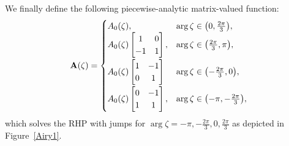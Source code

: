 \documentclass[pdftex]{sigma}
\numberwithin{equation}{section}
\theoremstyle{definition}
\begin{document}
We finally define the following piecewise-analytic matrix-valued function:{\samepage
\begin{gather}
		{\bf A} (\zeta) =
 \begin{cases}
 A_0(\zeta), & \operatorname{arg} \zeta\in\bigl(0,\frac{2\pi}{3}\bigr), \\
 A_0(\zeta)\begin{bmatrix}
 1 & 0 \\
 -1 & 1 \\
 \end{bmatrix}, & \operatorname{arg}\zeta\in\bigl(\frac{2\pi}{3},\pi\bigr), \\[10pt]
 A_0(\zeta)\begin{bmatrix}
 1 & -1\\
 0 & 1\\
 \end{bmatrix}
 & \operatorname{arg}\zeta\in\bigl(-\frac{2\pi}{3},0\bigr) , \\[10pt]
A_0(\zeta)\begin{bmatrix}
0 & -1 \\
 1 & 1\\
 \end{bmatrix}, & \operatorname{arg}\zeta\in\bigl(-\pi,-\frac{2\pi}{3}\bigr),
 \end{cases}\label{AiryParm}
\end{gather}
which solves the RHP with jumps for $\operatorname{arg} \zeta=-\pi,-\frac{2\pi}{3},0,\frac{2\pi}{3}$ as depicted in Figure~\ref{Airy1}.}
\end{document}
